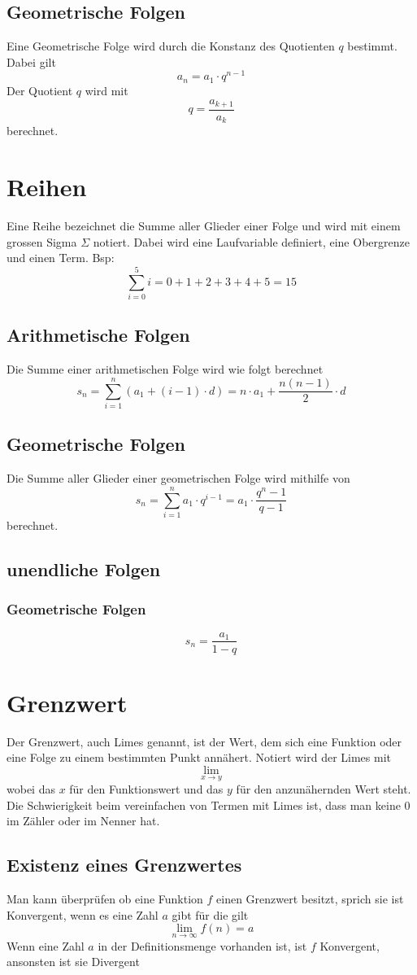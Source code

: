 \documentclass{article}
\begin{document}
\subsection{Geometrische Folgen}
Eine Geometrische Folge wird durch die Konstanz des Quotienten \(q\) bestimmt. Dabei gilt \[
		a_n = a_1 \cdot q^{n-1}
\]
Der Quotient \(q\) wird mit \[
		q = \frac{a_{k+1}}{a_k} 
\] berechnet.
\section{Reihen}
Eine Reihe bezeichnet die Summe aller Glieder einer Folge und wird mit einem grossen Sigma \(\Sigma\) notiert.
Dabei wird eine Laufvariable definiert, eine Obergrenze und einen Term. Bsp: \[
\sum_{i=0}^5 i = 0 + 1 + 2 + 3 + 4 + 5 = 15
\]
\subsection{Arithmetische Folgen}
Die Summe einer arithmetischen Folge wird wie folgt berechnet \[
		s_n = \sum_{i = 1}^n (a_1 + (i-1)\cdot d) = n \cdot a_1 + \frac{n(n-1)}{2} \cdot d
\]
\subsection{Geometrische Folgen}
Die Summe aller Glieder einer geometrischen Folge wird mithilfe von \[
		s_n = \sum_{i=1}^n a_1 \cdot q^{i-1} = a_1 \cdot \frac{q^n -1}{q-1} 
\] berechnet.

\subsection{unendliche Folgen}
\subsubsection{Geometrische Folgen}
\[
s_n = \frac{a_1}{1-q} 
\]
\section{Grenzwert}
Der Grenzwert, auch Limes genannt, ist der Wert, dem sich eine Funktion oder eine Folge zu einem bestimmten Punkt annähert. Notiert wird der Limes mit $$ \lim_{x \to y}$$wobei das $x$ für den Funktionswert und das $y$ für den anzunähernden Wert steht. Die Schwierigkeit beim vereinfachen von Termen mit Limes ist, dass man keine 0 im Zähler oder im Nenner hat.
\subsection{Existenz eines Grenzwertes}
Man kann überprüfen ob eine Funktion $f$ einen Grenzwert besitzt, sprich sie ist Konvergent, wenn es eine Zahl $a$ gibt für die gilt
$$ \lim_{n \to \infty}f(n) = a$$
Wenn eine Zahl $a$ in der Definitionsmenge vorhanden ist, ist $f$ Konvergent, ansonsten ist sie Divergent
\end{document}
